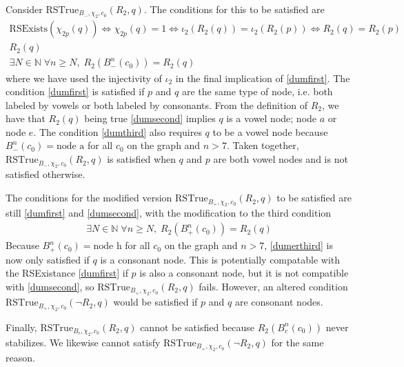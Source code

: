 \documentclass[11pt,a4paper]{article}
\newcommand{\RSExists}{\mathrm{RSExists}}
\newcommand{\RSTrue}{\mathrm{RSTrue}}
\begin{document}
Consider $\RSTrue_{B_{-},\chi_2,c_0}(R_2,q)$. The conditions for this to be satisfied are
\begin{align}
    \RSExists(\chi_{2p}(q))\Leftrightarrow\chi_{2p}(q)=1\Leftrightarrow\iota_2(R_2(q))=\iota_2(R_2(p))\Leftrightarrow R_2(q)=R_2(p)\label{dumfirst}\\
    R_2(q)\label{dumsecond}\\
    \exists N\in\mathbb{N}\;\forall n\ge N,\; R_2(B_{-}^n(c_0))=R_2(q)\label{dumthird}
\end{align}
where we have used the injectivity of $\iota_2$ in the final implication of \ref{dumfirst}. The condition \ref{dumfirst} is satisfied if $p$ and $q$ are the same type of node, i.e. both labeled by vowels or both labeled by consonants. From the definition of $R_2$, we have that $R_2(q)$ being true \ref{dumsecond} implies $q$ is a vowel node; node $a$ or node $e$. The condition \ref{dumthird} also requires $q$ to be a vowel node because $B_{-}^n(c_0)=\text{node a}$ for all $c_0$ on the graph and $n>7$. Taken together, $\RSTrue_{B_{-},\chi_2,c_0}(R_2,q)$ is satisfied when $q$ and $p$ are both vowel nodes and is not satisfied otherwise.

The conditions for the modified version $\RSTrue_{B_{+},\chi_2,c_0}(R_2,q)$ to be satisfied are still \ref{dumfirst} and \ref{dumsecond}, with the modification to the third condition
\begin{align}
    \exists N\in\mathbb{N}\;\forall n\ge N,\; R_2(B_{+}^n(c_0))=R_2(q)\label{dumerthird}
\end{align}
Because $B_{+}^n(c_0)=\text{node h}$ for all $c_0$ on the graph and $n>7$, \ref{dumerthird} is now only satisfied if $q$ is a consonant node. This is potentially compatable with the RSExistance \ref{dumfirst} if $p$ is also a consonant node, but it is not compatible with  \ref{dumsecond}, so $\RSTrue_{B_{+},\chi_2,c_0}(R_2,q)$ fails. However, an altered condition $\RSTrue_{B_{+},\chi_2,c_0}(\neg R_2,q)$ would be satisfied if $p$ and $q$ are consonant nodes.

Finally, $\RSTrue_{B_{c},\chi_2,c_0}(R_2,q)$ cannot be satisfied because $R_2(B_c^n(c_0))$ never stabilizes. We likewise cannot satisfy $\RSTrue_{B_{+},\chi_2,c_0}(\neg R_2,q)$ for the same reason.
\end{document}
